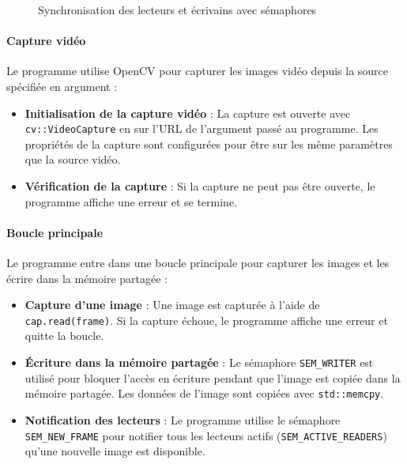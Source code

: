 \documentclass[a4paper, 11pt, french]{article}
\begin{document}
\begin{figure}[!ht]
\begin{tikzpicture}[node distance=1.6cm, scale=0.75, transform shape]
    \end{tikzpicture}
    \caption{Synchronisation des lecteurs et écrivains avec sémaphores}
    \label{fig:semaphores}
\end{figure}


\paragraph{Capture vidéo}
Le programme utilise OpenCV pour capturer les images vidéo depuis la source spécifiée en argument :
\begin{itemize}
    \item \textbf{Initialisation de la capture vidéo} : La capture est ouverte avec \texttt{cv::VideoCapture} en sur l'URL de l'argument passé au programme. Les propriétés de la capture sont configurées pour être sur les même paramètres que la source vidéo.
    \item \textbf{Vérification de la capture} : Si la capture ne peut pas être ouverte, le programme affiche une erreur et se termine.
\end{itemize}

\paragraph{Boucle principale}
Le programme entre dans une boucle principale pour capturer les images et les écrire dans la mémoire partagée :
\begin{itemize}
    \item \textbf{Capture d'une image} : Une image est capturée à l'aide de \texttt{cap.read(frame)}. Si la capture échoue, le programme affiche une erreur et quitte la boucle.
    \item \textbf{Écriture dans la mémoire partagée} : Le sémaphore \texttt{SEM\_WRITER} est utilisé pour bloquer l'accès en écriture pendant que l'image est copiée dans la mémoire partagée. Les données de l'image sont copiées avec \texttt{std::memcpy}.
    \item \textbf{Notification des lecteurs} : Le programme utilise le sémaphore \texttt{SEM\_NEW\_FRAME} pour notifier tous les lecteurs actifs (\texttt{SEM\_ACTIVE\_READERS}) qu'une nouvelle image est disponible.
\end{itemize}
\end{document}
